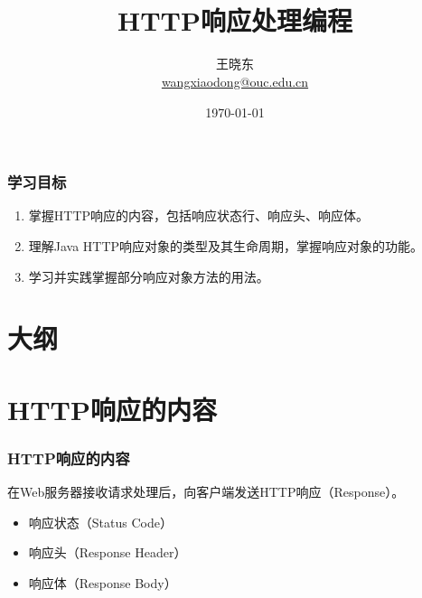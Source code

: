 
\title[KevinW@OUC]{\\  
HTTP响应处理编程}
\author[王晓东]{王晓东\\
  \href{mailto:wangxiaodong@ouc.edu.cn}{\footnotesize wangxiaodong@ouc.edu.cn}}
\date{\today}


 \frame{\titlepage}

\begin{frame}
  \frametitle{学习目标}

  \begin{enumerate}
  \item 掌握HTTP响应的内容，包括响应状态行、响应头、响应体。
  \item 理解Java HTTP响应对象的类型及其生命周期，掌握响应对象的功能。
  \item 学习并实践掌握部分响应对象方法的用法。
  \end{enumerate}  
\end{frame}

\section*{大纲}

\section{HTTP响应的内容}

\begin{frame}[fragile] %
\frametitle{HTTP响应的内容}

在Web服务器接收请求处理后，向客户端发送HTTP响应（Response）。


\begin{itemize}
\item 响应状态（Status Code）
\item 响应头（Response Header）
\item 响应体（Response Body）
\end{itemize}
\end{frame}

